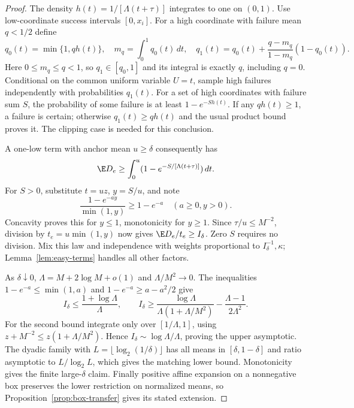 \begin{proof}
The density $h(t)=1/[\Lambda(t+\tau)]$ integrates to one on $(0,1)$.
Use low-coordinate success intervals $[0,x_i]$. For a high coordinate
with failure mean $q<1/2$ define
\[
 q_0(t)=\min\{1,qh(t)\},\quad m_q=\int_0^1q_0(t)\,dt,\quad
 q_1(t)=q_0(t)+\frac{q-m_q}{1-m_q}(1-q_0(t)).
\]
Here $0\le m_q\le q<1$, so $q_1\in[q_0,1]$ and its integral is exactly
$q$, including $q=0$. Conditional on the common uniform variable $U=t$,
sample high failures independently with probabilities $q_1(t)$.
For a set of high coordinates with failure sum $S$, the probability of
some failure is at least $1-e^{-Sh(t)}$. If any $qh(t)\ge1$, a failure
is certain; otherwise $q_1(t)\ge qh(t)$ and the usual product bound proves
it. The clipping case is needed for this conclusion.

A one-low term with anchor mean $u\ge\delta$ consequently has
\[
 \E D_e\ge\int_0^u(1-e^{-S/[\Lambda(t+\tau)]})\,dt.
\]
For $S>0$, substitute $t=uz$, $y=S/u$, and note
\[
 \frac{1-e^{-ay}}{\min(1,y)}\ge1-e^{-a}\quad(a\ge0,y>0).
\]
Concavity proves this for $y\le1$, monotonicity for $y\ge1$.
Since $\tau/u\le M^{-2}$, division by $t_e=u\min(1,y)$ now gives
$\E D_e/t_e\ge I_\delta$. Zero $S$ requires no division. Mix this law
and independence with weights proportional to $I_\delta^{-1},\kappa$;
Lemma~\ref{lem:easy-terms} handles all other factors.

As $\delta\downarrow0$, $\Lambda=M+2\log M+o(1)$ and
$\Lambda/M^2\to0$. The inequalities $1-e^{-a}\le\min(1,a)$ and
$1-e^{-a}\ge a-a^2/2$ give
\[
 I_\delta\le\frac{1+\log\Lambda}{\Lambda},\qquad
 I_\delta\ge\frac{\log\Lambda}{\Lambda(1+\Lambda/M^2)}
                   -\frac{\Lambda-1}{2\Lambda^2}.
\]
For the second bound integrate only over $[1/\Lambda,1]$, using
$z+M^{-2}\le z(1+\Lambda/M^2)$. Hence
$I_\delta\sim\log\Lambda/\Lambda$, proving the upper asymptotic.
The dyadic family with $L=\lfloor\log_2(1/\delta)\rfloor$ has all means
in $[\delta,1-\delta]$ and ratio asymptotic to $L/\log_2 L$, which gives
the matching lower bound. Monotonicity gives the finite large-$\delta$
claim. Finally positive affine expansion on a nonnegative box preserves
the lower restriction on normalized means, so
Proposition~\ref{prop:box-transfer} gives its stated extension.
\end{proof}

